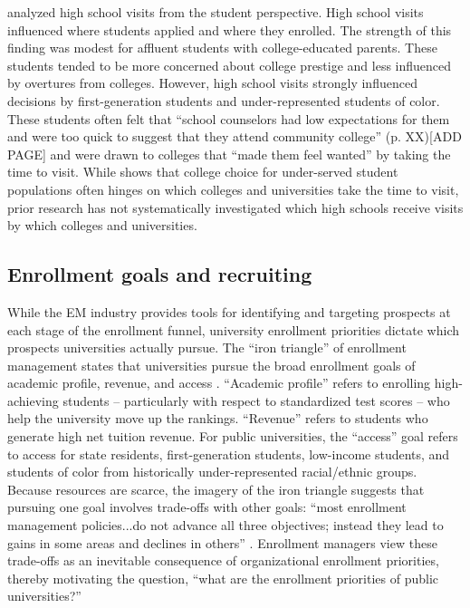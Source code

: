 \documentclass[twoside]{article}
\begin{document}
\cite{RN4324} analyzed high school visits from the student perspective. High school visits influenced where students applied and where they enrolled. The strength of this finding was modest for affluent students with college-educated parents. These students tended to be more concerned about college prestige and less influenced by overtures from colleges. However, high school visits strongly influenced decisions by  first-generation students and under-represented students of color.  These students often felt that ``school counselors had low expectations for them and were too quick to suggest that they attend community college'' (p. XX)[ADD PAGE] and were drawn to colleges that ``made them feel wanted'' by taking the time to visit.  While \cite{RN4324} shows that college choice for under-served student populations often hinges on which colleges and universities take the time to visit, prior research has not systematically investigated which high schools receive visits by which colleges and universities.

\subsection*{Enrollment goals and recruiting}

While the EM industry provides tools for identifying and targeting prospects at each stage of the enrollment funnel, university enrollment priorities dictate which prospects universities actually pursue.  The ``iron triangle'' of enrollment management states that universities pursue the broad enrollment goals of academic profile, revenue, and access \citep{RN2772}. ``Academic profile'' refers to enrolling high-achieving students -- particularly with respect to standardized test scores -- who help the university move up the rankings. ``Revenue'' refers to students who generate high net tuition revenue.  For public universities, the ``access'' goal refers to access for state residents, first-generation students, low-income students, and students of color from historically under-represented racial/ethnic groups. Because resources are scarce, the imagery of the iron triangle suggests that pursuing one goal involves trade-offs with other goals: ``most enrollment management policies...do not advance all three objectives; instead they lead to gains in some areas and declines in others'' \citep[p.~221]{RN2772}. Enrollment managers view these trade-offs as an inevitable consequence of organizational enrollment priorities, thereby motivating the question, ``what are the enrollment priorities of public universities?''
\end{document}
